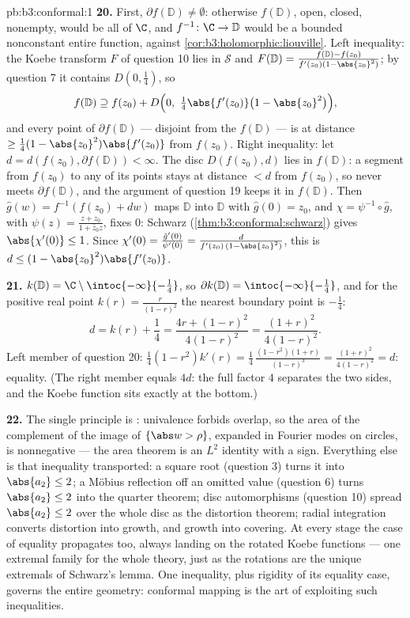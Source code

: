\begin{solution}{pb:b3:conformal:1}
\textbf{20.} First, $\partial f(\mathbb D) \neq \emptyset$:
otherwise $f(\mathbb D)$, open, closed, nonempty, would be
all of $\C$, and $f^{-1} \colon \C \to \mathbb D$ would be a
bounded nonconstant entire function, against
\cref{cor:b3:holomorphic:liouville}. Left inequality: the
Koebe transform $F$ of question 10 lies in $\mathcal S$ and
$F(\mathbb D) = \frac{f(\mathbb D) -
f(z_0)}{f'(z_0)(1-\abs{z_0}^2)}$; by question 7 it contains
$D(0, \frac14)$, so
\[
f(\mathbb D) \supseteq f(z_0) + D\Bigl(0,\
\tfrac14\abs{f'(z_0)}\bigl(1 - \abs{z_0}^2\bigr)\Bigr) ,
\]
and every point of $\partial f(\mathbb D)$ --- disjoint from
the  $f(\mathbb D)$ --- is at distance $\geq
\frac14(1-\abs{z_0}^2)\abs{f'(z_0)}$ from $f(z_0)$. Right
inequality: let $d = d(f(z_0), \partial f(\mathbb D)) <
\infty$. The disc $D(f(z_0), d)$ lies in $f(\mathbb D)$: a
segment from $f(z_0)$ to any of its points stays at distance
$< d$ from $f(z_0)$, so never meets $\partial f(\mathbb D)$,
and the  argument of question 19 keeps it in
$f(\mathbb D)$. Then $\hat g(w) = f^{-1}(f(z_0) + dw)$ maps
$\mathbb D$ into $\mathbb D$ with $\hat g(0) = z_0$, and
$\chi = \psi^{-1}\circ\hat g$, with $\psi(z) = \frac{z +
z_0}{1 + \bar z_0z}$, fixes $0$: Schwarz
(\cref{thm:b3:conformal:schwarz}) gives $\abs{\chi'(0)}
\leq 1$. Since $\chi'(0) = \frac{\hat g'(0)}{\psi'(0)} =
\frac{d}{f'(z_0)\,(1 - \abs{z_0}^2)}$, this is $d \leq (1 -
\abs{z_0}^2)\abs{f'(z_0)}$.

\textbf{21.} $k(\mathbb D) = \C\setminus
\intoc{-\infty}{-\frac14}$, so $\partial k(\mathbb D) =
\intoc{-\infty}{-\frac14}$, and for the positive real point
$k(r) = \frac r{(1-r)^2}$ the nearest boundary point is
$-\frac14$:
\[
d = k(r) + \frac14 = \frac{4r + (1-r)^2}{4(1-r)^2}
= \frac{(1+r)^2}{4(1-r)^2} .
\]
Left member of question 20: $\frac14(1 - r^2)k'(r) =
\frac14\,\frac{(1-r^2)(1+r)}{(1-r)^3} =
\frac{(1+r)^2}{4(1-r)^2} = d$: equality. (The right member
equals $4d$: the full factor $4$ separates the two sides,
and the Koebe function sits exactly at the bottom.)

\textbf{22.} The single principle is : univalence
forbids overlap, so the area of the complement of the image
of $\{\abs w > \rho\}$, expanded in Fourier modes on
circles, is nonnegative --- the area theorem is an $L^2$
identity with a sign. Everything else is that inequality
transported: a square root (question 3) turns it into
$\abs{a_2} \leq 2$; a M\"obius reflection off an omitted
value (question 6) turns $\abs{a_2} \leq 2$ into the quarter
theorem; disc automorphisms (question 10) spread $\abs{a_2}
\leq 2$ over the whole disc as the distortion theorem;
radial integration converts distortion into growth, and
growth into covering. At every stage the case of equality
propagates too, always landing on the rotated Koebe
functions --- one extremal family for the whole theory, just
as the rotations are the unique extremals of Schwarz's
lemma. One  inequality, plus rigidity of its
equality case, governs the entire geometry: conformal
mapping is the art of exploiting such inequalities.


\end{solution}
